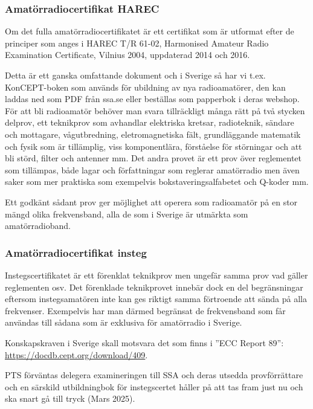 \subsubsection{Amatörradiocertifikat HAREC}

Om det fulla amatörradiocertifikatet är ett certifikat som är utformat
efter de principer som anges i HAREC T/R 61-02, Harmonised Amateur
Radio Examination Certificate, Vilnius 2004, uppdaterad 2014 och 2016.

Detta är ett ganska omfattande dokument och i Sverige så har vi t.ex.
KonCEPT-boken som används för ubildning av nya radioamatörer, den kan
laddas ned som PDF från ssa.se eller beställas som papperbok i deras
webshop. För att bli radioamatör behöver man svara tillräckligt många
rätt på två stycken delprov, ett teknikprov som avhandlar elektriska
kretsar, radioteknik, sändare och mottagare, vågutbredning,
eletromagnetiska fält, grundläggande matematik och fysik som är
tillämplig, viss komponentlära, förståelse för störningar och att bli
störd, filter och antenner mm. Det andra provet är ett prov över
reglementet som tillämpas, både lagar och författningar som reglerar
amatörradio men även saker som mer praktiska som exempelvis
bokstaveringsalfabetet och Q-koder mm.

Ett godkänt sådant prov ger möjlighet att operera som radioamatör på
en stor mängd olika frekvensband, alla de som i Sverige är utmärkta
som amatörradioband.

\subsubsection{Amatörradiocertifikat insteg}
\label{sec:instegscertifikat}

Instegscertifikatet är ett förenklat teknikprov men ungefär samma prov
vad gäller reglementen osv. Det förenklade teknikprovet innebär dock
en del begränsningar eftersom instegsamatören inte kan ges riktigt
samma förtroende att sända på alla frekvenser. Exempelvis har man
därmed begränsat de frekvensband som får användas till sådana som är
exklusiva för amatörradio i Sverige.

Konskapskraven i Sverige skall motsvara det som finns i ''ECC Report 89'': \\
\url{https://docdb.cept.org/download/409}.

PTS förväntas delegera examineringen till SSA och deras utsedda provförrättare
och en särskild utbildningbok för instegscertet håller på att tas fram just
nu och ska snart gå till tryck (Mars 2025).

